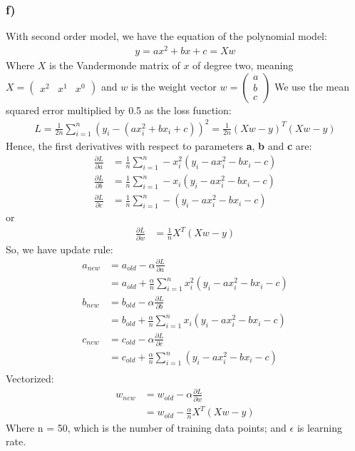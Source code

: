 \documentclass{article}
\begin{document}
\subsubsection*{f)}
With second order model, we have the equation of the polynomial model:
\begin{align*}
y = ax^2 + bx + c = Xw
\end{align*}
Where $X$ is the Vandermonde matrix of $x$ of degree two, meaning $X = \begin{pmatrix*}x^2 & x^1 & x^0\end{pmatrix*}$ and $w$ is the weight vector $w = \begin{pmatrix*}a \\ b \\ c\end{pmatrix*}$
We use the mean squared error multiplied by 0.5 as the loss function:
\begin{align*}
L = \frac{1}{2n}\sum\limits_{i=1}^{n}(y_{i} - (ax_{i}^2 +bx_i + c))^2 = \frac{1}{2n} (Xw - y)^T (Xw - y)
\end{align*}
Hence, the first derivatives with respect to parameters \textbf{a}, \textbf{b} and \textbf{c} are:
\begin{align*}
\frac{\partial L}{\partial a} &= \frac{1}{n}\sum\limits_{i=1}^{n}-x_i^2(y_i - ax_{i}^2 -bx_i - c)\\
\frac{\partial L}{\partial b} &= \frac{1}{n}\sum\limits_{i=1}^{n}-x_i(y_i - ax_{i}^2 -bx_i - c)\\
\frac{\partial L}{\partial c} &= \frac{1}{n}\sum\limits_{i=1}^{n}-(y_i - ax_{i}^2 -bx_i - c)
\end{align*}
or 
\begin{align*}
\frac{\partial L}{\partial w} &= \frac{1}{n} X^T(Xw - y) 
\end{align*}
So, we have update rule:
\begin{align*}
a_{new} &= a_{old} - \alpha\frac{\partial L}{\partial a}\\
&= a_{old} + \frac{\alpha}{n}\sum\limits_{i=1}^{n}x_i^2(y_i - ax_{i}^2 -bx_i - c)\\
b_{new} &= b_{old} - \alpha\frac{\partial L}{\partial b}\\
&= b_{old} + \frac{\alpha}{n}\sum\limits_{i=1}^{n}x_i(y_i - ax_{i}^2 -bx_i - c)\\
c_{new} &= c_{old} - \alpha\frac{\partial L}{\partial c}\\
&= c_{old} + \frac{\alpha}{n}\sum\limits_{i=1}^{n}(y_i - ax_{i}^2 -bx_i - c)\\
\end{align*}
Vectorized:
\begin{align*}
w_{new} &= w_{old} - \alpha \frac{\partial L}{\partial w} \\
&= w_{old} - \frac{\alpha}{n} X^T(Xw - y)
\end{align*}
Where n = 50, which is the number of training data points; and $\epsilon$ is learning rate.
\end{document}

